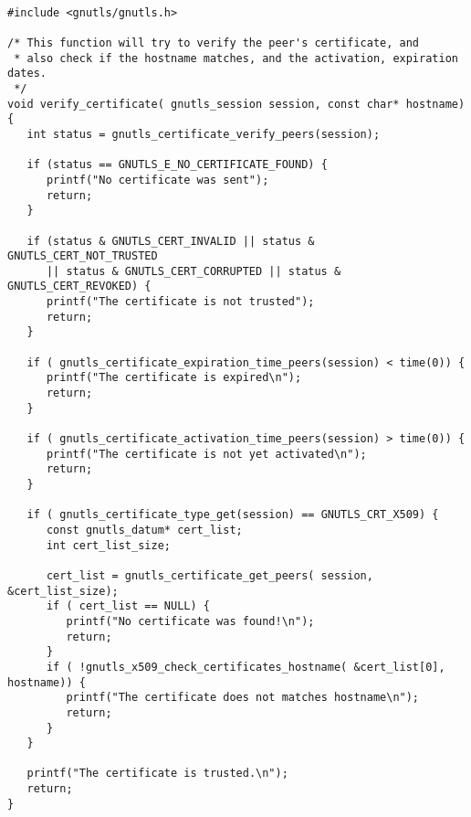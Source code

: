 \label{ex:rfc2818}

\begin{verbatim}

#include <gnutls/gnutls.h>

/* This function will try to verify the peer's certificate, and
 * also check if the hostname matches, and the activation, expiration dates.
 */
void verify_certificate( gnutls_session session, const char* hostname)
{
   int status = gnutls_certificate_verify_peers(session);

   if (status == GNUTLS_E_NO_CERTIFICATE_FOUND) {
      printf("No certificate was sent");
      return;
   }

   if (status & GNUTLS_CERT_INVALID || status & GNUTLS_CERT_NOT_TRUSTED
      || status & GNUTLS_CERT_CORRUPTED || status & GNUTLS_CERT_REVOKED) {
      printf("The certificate is not trusted");
      return;
   }

   if ( gnutls_certificate_expiration_time_peers(session) < time(0)) {
      printf("The certificate is expired\n");
      return;
   }

   if ( gnutls_certificate_activation_time_peers(session) > time(0)) {
      printf("The certificate is not yet activated\n");
      return;
   }

   if ( gnutls_certificate_type_get(session) == GNUTLS_CRT_X509) {
      const gnutls_datum* cert_list;
      int cert_list_size;
      
      cert_list = gnutls_certificate_get_peers( session, &cert_list_size);
      if ( cert_list == NULL) {
         printf("No certificate was found!\n");
         return;
      }
      if ( !gnutls_x509_check_certificates_hostname( &cert_list[0], hostname)) {
         printf("The certificate does not matches hostname\n");
         return;
      }
   }
   
   printf("The certificate is trusted.\n");
   return;
}

\end{verbatim}
